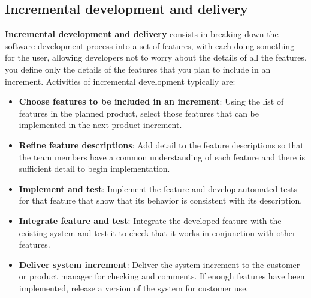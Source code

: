 \subsection{Incremental development and delivery}
\textbf{Incremental development and delivery} consists in breaking down the software development process into a set of features, with each doing something for the user, allowing developers not to worry about the details of all the features, you define only the details of the features that you plan to include in an increment.
Activities of incremental development typically are:
\begin{itemize}
   \item \textbf{Choose features to be included in an increment}: Using the list of features in the planned product, select those features that can be implemented in the next product increment.

   \item \textbf{Refine feature descriptions}: Add detail to the feature descriptions so that the team members have a common understanding of each feature and there is sufficient detail to begin implementation.
   \item \textbf{Implement and test}: Implement the feature and develop automated tests for that feature that show that its behavior is consistent with its description.
   \item \textbf{Integrate feature and test}: Integrate the developed feature with the existing system and test it to check that it works in conjunction with other features.
   \item \textbf{Deliver system increment}: Deliver the system increment to the customer or product manager for checking and comments. If enough features have been implemented, release a version of the system for customer use.
\end{itemize}
